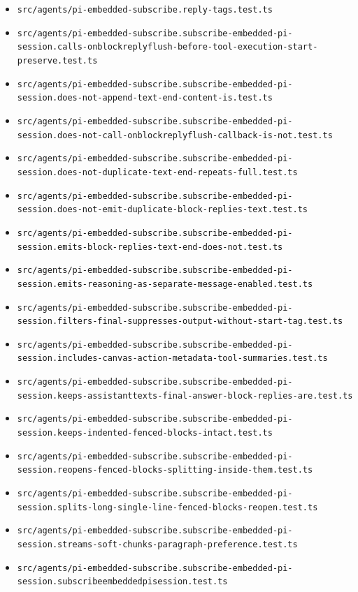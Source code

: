 \begin{itemize}
  \item \texttt{src/agents/pi-embedded-subscribe.reply-tags.test.ts}
  \item \texttt{src/agents/pi-embedded-subscribe.subscribe-embedded-pi-session.calls-onblockreplyflush-before-tool-execution-start-preserve.test.ts}
  \item \texttt{src/agents/pi-embedded-subscribe.subscribe-embedded-pi-session.does-not-append-text-end-content-is.test.ts}
  \item \texttt{src/agents/pi-embedded-subscribe.subscribe-embedded-pi-session.does-not-call-onblockreplyflush-callback-is-not.test.ts}
  \item \texttt{src/agents/pi-embedded-subscribe.subscribe-embedded-pi-session.does-not-duplicate-text-end-repeats-full.test.ts}
  \item \texttt{src/agents/pi-embedded-subscribe.subscribe-embedded-pi-session.does-not-emit-duplicate-block-replies-text.test.ts}
  \item \texttt{src/agents/pi-embedded-subscribe.subscribe-embedded-pi-session.emits-block-replies-text-end-does-not.test.ts}
  \item \texttt{src/agents/pi-embedded-subscribe.subscribe-embedded-pi-session.emits-reasoning-as-separate-message-enabled.test.ts}
  \item \texttt{src/agents/pi-embedded-subscribe.subscribe-embedded-pi-session.filters-final-suppresses-output-without-start-tag.test.ts}
  \item \texttt{src/agents/pi-embedded-subscribe.subscribe-embedded-pi-session.includes-canvas-action-metadata-tool-summaries.test.ts}
  \item \texttt{src/agents/pi-embedded-subscribe.subscribe-embedded-pi-session.keeps-assistanttexts-final-answer-block-replies-are.test.ts}
  \item \texttt{src/agents/pi-embedded-subscribe.subscribe-embedded-pi-session.keeps-indented-fenced-blocks-intact.test.ts}
  \item \texttt{src/agents/pi-embedded-subscribe.subscribe-embedded-pi-session.reopens-fenced-blocks-splitting-inside-them.test.ts}
  \item \texttt{src/agents/pi-embedded-subscribe.subscribe-embedded-pi-session.splits-long-single-line-fenced-blocks-reopen.test.ts}
  \item \texttt{src/agents/pi-embedded-subscribe.subscribe-embedded-pi-session.streams-soft-chunks-paragraph-preference.test.ts}
  \item \texttt{src/agents/pi-embedded-subscribe.subscribe-embedded-pi-session.subscribeembeddedpisession.test.ts}

\end{itemize}
